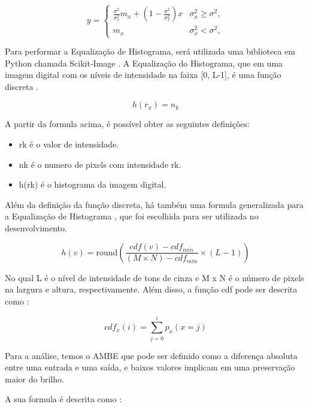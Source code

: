 \documentclass[conference]{IEEEtran}
\begin{document}
\begin{equation}
y=\left\{ \begin{array}{cc} \frac{\sigma^{2}}{\sigma_{x}^{2}}m_{x}+\left(1-\frac{\sigma^{2}}{\sigma_{x}^{2}}\right)x & \sigma_{x}^{2}\geq\sigma^{2},\\ m_{x} & \sigma_{x}^{2}<\sigma^{2},\end{array}\right.
\end{equation}

Para performar a Equalização de Histograma, será utilizada uma biblioteca em Python chamada Scikit-Image \cite{b11}. A Equalização do Histograma, que em uma imagem digital com os níveis de intensidade na faixa [0, L-1], é uma função discreta \cite{b9}.

\begin{equation}
h(r_{x}) = n_{k}
\end{equation}

A partir da formula acima, é possível obter as seguintes definições:

\begin{itemize}
\item rk é o valor de intensidade.
\item nk é o numero de pixels com intensidade rk.
\item h(rk) é o histograma da imagem digital.
\end{itemize}

Além da definição da função discreta, há também uma formula generalizada para a Equalização de Histograma \cite{b14}, que foi escolhida para ser utilizada no desenvolvimento. 

\begin{equation}
h(v)=\mathrm {round} \left({\frac {cdf(v)-cdf_{min}}{(M\times N)-cdf_{min}}}\times (L-1)\right)
\end{equation}

No qual L é o nível de intensidade de tons de cinza e M x N é o número de pixels na largura e altura, respectivamente. Além disso, a função cdf pode ser descrita como \cite{b14}:

\begin{equation}
cdf_{x}(i)=\sum _{j=0}^{i}p_{x}(x=j)
\end{equation}

Para a análise, temos o AMBE que pode ser definido como a diferença absoluta entre uma entrada e uma saída, e baixos valores implicam em uma preservação maior do brilho. 

A sua formula é descrita como \cite{b13}:
\end{document}
